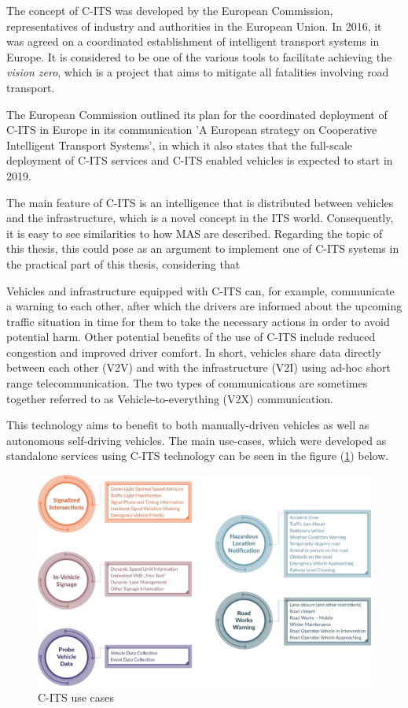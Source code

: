 \documentclass[main.tex]{subfiles}
\begin{document}
The concept of C-ITS was developed by the European Commission, representatives of industry and 
authorities in the European Union. In 2016, it was agreed on a coordinated establishment of intelligent
transport systems in Europe. It is considered to be one of the various tools to facilitate achieving 
the \emph{vision zero}, which is a project that aims to mitigate all fatalities involving road 
transport.

The European Commission outlined its plan for the coordinated deployment of C-ITS in Europe in
its communication 'A European strategy on Cooperative Intelligent Transport Systems', in which
it also states that the full-scale deployment of C-ITS services and C-ITS enabled vehicles is
expected to start in 2019.

The main feature of C-ITS is an intelligence that is distributed between vehicles and the infrastructure, 
which is a novel concept in the ITS world. Consequently, it is easy to see similarities to how 
MAS are described. Regarding the topic of this thesis, this could pose as an argument to
implement one of C-ITS systems in the practical part of this thesis, considering that  

Vehicles and infrastructure equipped with C-ITS can, for example, communicate a warning to each
other, after which the drivers are informed about the upcoming traffic situation in time for
them to take the necessary actions in order to avoid potential harm. Other potential benefits
of the use of C-ITS include reduced congestion and improved driver comfort. In short, vehicles 
share data directly between each other (V2V) and with the infrastructure (V2I) using ad-hoc
short range telecommunication. The two types of communications are sometimes together referred 
to as Vehicle-to-everything (V2X) communication.

This technology aims to benefit to both manually-driven vehicles 
as well as autonomous self-driving vehicles. The main use-cases, which were developed as
standalone services using C-ITS technology can be seen in the figure (\ref{c-its-use-case})
below.

\begin{figure}[htbp]
    \centering
    \includegraphics[width=.8\textwidth]{c-its-kolecka.png}
    \caption{C-ITS use cases \cite{2022}}
    \label{c-its-use-case}
\end{figure}
\end{document}
